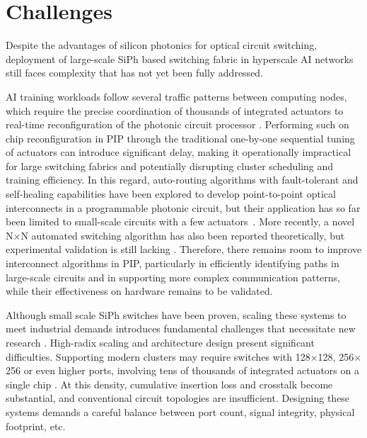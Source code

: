 \section{Challenges} \label{sec:challenges}
Despite the advantages of silicon photonics for optical circuit switching, deployment of large-scale SiPh based switching fabric in hyperscale AI networks still faces complexity that has not yet been fully addressed.

AI training workloads follow several traffic patterns between computing nodes, which require the precise coordination of thousands of integrated actuators to real-time reconfiguration of the photonic circuit processor \cite{bogaerts2020programmable}.
Performing such on chip reconfiguration in PIP through the traditional one-by-one sequential tuning of actuators can introduce significant delay, making it operationally impractical for large switching fabrics and potentially disrupting cluster scheduling and training efficiency.
In this regard, auto-routing algorithms with fault-tolerant and self-healing capabilities have been explored to develop point-to-point optical interconnects in a programmable photonic circuit, but their application has so far been limited to small-scale circuits with a few actuators~\cite{lopez2020auto}.
More recently, a novel N$\times$N automated switching algorithm has also been reported theoretically, but experimental validation is still lacking \cite{vanden2023automated}.
Therefore, there remains room to improve interconnect algorithms in PIP, particularly in efficiently identifying paths in large-scale circuits and in supporting more complex communication patterns, while their effectiveness on hardware remains to be validated.

Although small scale SiPh switches have been proven, scaling these systems to meet industrial demands introduces fundamental challenges that necessitate new research \cite{tanizawa2015ultra, suzukiUltracompact882014, tanizawa2016ultra, suzuki2025band}.
High-radix scaling and architecture design present significant difficulties.
Supporting modern clusters may require switches with 128$\times$128, 256$\times$256 or even higher ports, involving tens of thousands of integrated actuators on a single chip \cite{patronas2024optical, perez2025large}.
At this density, cumulative insertion loss and crosstalk become substantial, and conventional circuit topologies are insufficient.
Designing these systems demands a careful balance between port count, signal integrity, physical footprint, etc.

